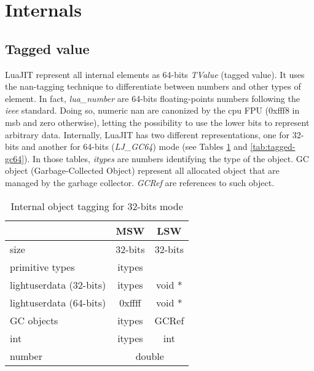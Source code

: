 
 \section{Internals}
 \label{Sec:Internals}
    

\subsection{Tagged value}
\label{Subsec:tagged-value}

LuaJIT represent all internal elements as 64-bits \emph{TValue} (tagged value).
It uses the nan-tagging technique to differentiate between numbers and other
types of element. In fact, \emph{lua\_number} are 64-bits floating-points numbers
following the \emph{ieee} standard. Doing so, numeric nan are canonized by the
cpu FPU (0xfff8 in msb and zero otherwise), letting the possibility to use the
lower bits to represent arbitrary data. Internally, LuaJIT has two different
representations, one for 32-bits and another for 64-bits (\emph{LJ\_GC64}) mode
(see Tables \ref{tab:tagged-gc32} and \ref{tab:tagged-gc64}). In those tables,
\emph{itypes} are numbers identifying the type of the object.
GC object (Garbage-Collected Object) represent all allocated object
that are managed by the garbage collector. \emph{GCRef} are references to such
object.

\begin{table}[H]
\centering
\caption{Internal object tagging for 32-bits mode}
\label{tab:tagged-gc32}
\begin{tabular}{l|c|c|c|}
\cline{2-4}
                                              & \multicolumn{2}{c|}{MSW}         & LSW         \\ \hline
\multicolumn{1}{|l|}{size}                    & \multicolumn{2}{c|}{32-bits}     & 32-bits     \\ \hline
\multicolumn{1}{|l|}{primitive types}         & \multicolumn{2}{c|}{itypes}      &             \\
\multicolumn{1}{|l|}{lightuserdata (32-bits)} & \multicolumn{2}{c|}{itypes}      & void *      \\
\multicolumn{1}{|l|}{lightuserdata (64-bits)} & 0xffff           & \multicolumn{2}{c|}{void *} \\
\multicolumn{1}{|l|}{GC objects}              & \multicolumn{2}{c|}{itypes}      & GCRef       \\
\multicolumn{1}{|l|}{int}                     & \multicolumn{2}{c|}{itypes}      & int         \\
\multicolumn{1}{|l|}{number}                  & \multicolumn{3}{c|}{double}                    \\ \hline
\end{tabular}
\end{table}

